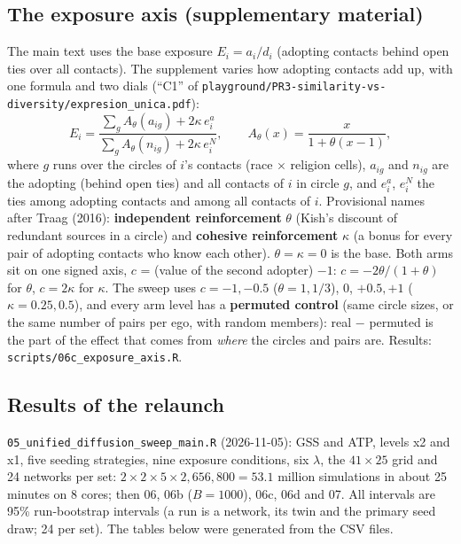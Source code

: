 \documentclass[11pt,a4paper]{article}
\newcommand{\code}[1]{\texttt{#1}}
\begin{document}
\subsection{The exposure axis (supplementary material)}
\label{sec:exposureaxis}

The main text uses the base exposure $E_i = a_i/d_i$ (adopting contacts behind open ties
over all contacts). The supplement varies how adopting contacts add up, with one formula
and two dials (``C1'' of \code{playground/PR3-similarity-vs-diversity/expresion\_unica.pdf}):
\begin{equation*}
  E_i = \frac{\sum_g A_\theta(a_{ig}) + 2\kappa\, e^{a}_{i}}{\sum_g A_\theta(n_{ig}) + 2\kappa\, e^{N}_{i}},
  \qquad A_\theta(x) = \frac{x}{1 + \theta (x - 1)},
\end{equation*}
where $g$ runs over the circles of $i$'s contacts (race $\times$ religion cells), $a_{ig}$
and $n_{ig}$ are the adopting (behind open ties) and all contacts of $i$ in circle $g$, and
$e^{a}_{i}$, $e^{N}_{i}$ the ties among adopting contacts and among all contacts of $i$.
Provisional names after Traag (2016): \textbf{independent reinforcement} $\theta$ (Kish's
discount of redundant sources in a circle) and \textbf{cohesive reinforcement} $\kappa$ (a
bonus for every pair of adopting contacts who know each other). $\theta = \kappa = 0$ is
the base. Both arms sit on one signed axis, $c$ = (value of the second adopter) $- 1$:
$c = -2\theta/(1+\theta)$ for $\theta$, $c = 2\kappa$ for $\kappa$. The sweep uses
$c = -1, -0.5$ ($\theta = 1, 1/3$), $0$, $+0.5, +1$ ($\kappa = 0.25, 0.5$), and every arm
level has a \textbf{permuted control} (same circle sizes, or the same number of pairs per
ego, with random members): real $-$ permuted is the part of the effect that comes from
\emph{where} the circles and pairs are. Results: \code{scripts/06c\_exposure\_axis.R}.

\subsection{Results of the relaunch}
\label{sec:pr4results}

\code{05\_unified\_diffusion\_sweep\_main.R} (2026-11-05): GSS and ATP, levels x2 and x1,
five seeding strategies, nine exposure conditions, six $\lambda$, the $41 \times 25$ grid
and 24 networks per set: $2 \times 2 \times 5 \times 2{,}656{,}800 = 53.1$ million
simulations in about 25 minutes on 8 cores; then 06, 06b ($B = 1000$), 06c, 06d and 07.
All intervals are 95\% run-bootstrap intervals (a run is a network, its twin and the
primary seed draw; 24 per set). The tables below were generated from the CSV files.
\end{document}
